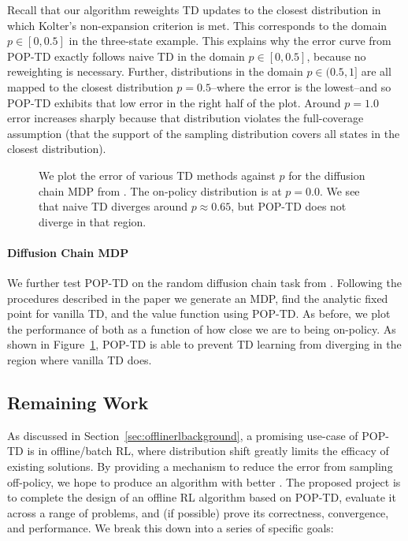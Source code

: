 \documentclass[11pt]{article}
\begin{document}
Recall that our algorithm reweights TD updates to the closest distribution in which Kolter's non-expansion criterion is met. This corresponds to the domain $p\in[0, 0.5]$ in the three-state example. This explains why the error curve from POP-TD exactly follows naive TD in the domain $p\in[0, 0.5]$, because no reweighting is necessary. Further, distributions in the domain $p\in(0.5, 1]$ are all mapped to the closest distribution $p=0.5$--where the error is the lowest--and so POP-TD exhibits that low error in the right half of the plot. Around $p=1.0$ error increases sharply because that distribution violates the full-coverage assumption (that the support of the sampling distribution covers all states in the closest distribution).


\begin{figure}[t]
  
  \caption{We plot the error of various TD methods against $p$ for the diffusion chain MDP from \cite{manek2022pitfalls}. The on-policy distribution is at $p=0.0$. We see that naive TD diverges around $p\approx0.65$, but POP-TD does not diverge in that region. }
  \label{fig:prelimdiffusion}
\end{figure}

\paragraph{Diffusion Chain MDP} We further test POP-TD on the random diffusion chain task from \cite{kolter2011fixed}. Following the procedures described in the paper we generate an MDP, find the analytic fixed point for vanilla TD, and the value function using POP-TD. As before, we plot the performance of both as a function of how close we are to being on-policy. As shown in Figure~\ref{fig:prelimdiffusion}, POP-TD is able to prevent TD learning from diverging in the region where vanilla TD does.


\subsection{Remaining Work }

As discussed in Section~\ref{sec:offlinerlbackground}, a promising use-case of POP-TD is in offline/batch RL, where distribution shift greatly limits the efficacy of existing solutions. By providing a mechanism to reduce the error from sampling off-policy, we hope to produce an algorithm with better . The proposed project is to complete the design of an offline RL algorithm based on POP-TD, evaluate it across a range of problems, and (if possible) prove its correctness, convergence, and performance.
We break this down into a series of specific goals:
\end{document}

